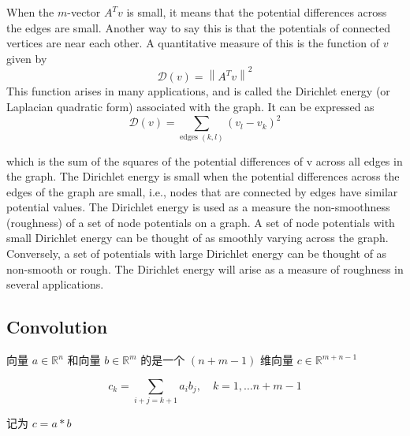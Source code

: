 When the $ m $-vector $ A^{T} v $ is small, it means that the potential differences across the edges are small. Another way to say this is that the potentials of connected vertices are near each other. A quantitative measure of this is the function of $ v $ given by
$$
\mathcal{D}(v)=\left\|A^{T} v\right\|^{2}
$$
This function arises in many applications, and is called the Dirichlet energy (or Laplacian quadratic form) associated with the graph. It can be expressed as
$$
\mathcal{D}(v)=\sum_{\text {edges }(k, l)}\left(v_{l}-v_{k}\right)^{2}
$$

which is the sum of the squares of the potential differences of v across all edges in
the graph. The Dirichlet energy is small when the potential differences across the
edges of the graph are small, i.e., nodes that are connected by edges have similar
potential values.
The Dirichlet energy is used as a measure the non-smoothness (roughness) of
a set of node potentials on a graph. A set of node potentials with small Dirichlet
energy can be thought of as smoothly varying across the graph. Conversely, a set
of potentials with large Dirichlet energy can be thought of as non-smooth or rough.
The Dirichlet energy will arise as a measure of roughness in several applications.

\subsection{Convolution}


\begin{definition}[一维卷积]
    向量 $ a \in \mathbb{R}^{n} $ 和向量 $ b \in \mathbb{R}^{m} $ 的是一个 $ ({n}+{m}-1) $ 维向量 $ c \in \mathbb{R}^{m+{n}-1} $

    $$ c_{k}=\sum_{i+j=k+1} a_{i} b_{j}, \quad k=1, \ldots n+m-1 $$

    记为 $ c=a * b$
\end{definition}

